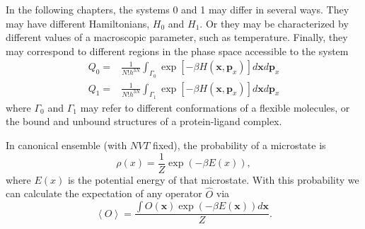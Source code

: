 In the following chapters, the systems 0 and 1 may differ in several ways. They may have different Hamiltonians, $H_0$ and $H_1$. Or they may be characterized by different values of a macroscopic parameter, such as temperature. Finally, they may correspond to different regions in the phase space accessible to the system
\begin{align}
Q_0=&\frac{1}{N!h^{3N}}\int_{\Gamma_0}\exp{\left[-\beta H(\mathbf{x},\mathbf{p}_x)\right]}d\mathbf{x}d\mathbf{p}_x\\
Q_1=&\frac{1}{N!h^{3N}}\int_{\Gamma_1}\exp{\left[-\beta H(\mathbf{x},\mathbf{p}_x)\right]}d\mathbf{x}d\mathbf{p}_x
\end{align}
where $\Gamma_0$ and $\Gamma_1$ may refer to different conformations of a flexible molecules, or the bound and unbound structures of a protein-ligand complex.

In canonical ensemble (with $NVT$ fixed), the probability of a microstate is
\begin{equation}
\rho(x)=\frac{1}{Z}\exp{(-\beta E(x))},
\end{equation}
where $E(x)$ is the potential energy of that microstate. With this probability we can calculate the expectation of any operator $\hat{O}$ via
\begin{equation}
\left<O\right>=\frac{\int O(\mathbf{x})\exp{(-\beta E(\mathbf{x}))}d\mathbf{x}}{Z}.
\end{equation}

